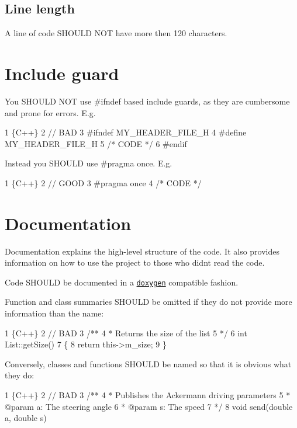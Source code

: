 \subsection*{Line length}

A line of code S\+H\+O\+U\+LD N\+OT have more then 120 characters.

\section*{Include guard}

You S\+H\+O\+U\+LD N\+OT use {\ttfamily \#ifndef} based include guards, as they are cumbersome and prone for errors. E.\+g. 
\begin{DoxyCode}
1 \{C++\}
2 // BAD
3 #ifndef MY\_HEADER\_FILE\_H
4 #define MY\_HEADER\_FILE\_H
5 /* CODE */
6 #endif
\end{DoxyCode}
 Instead you S\+H\+O\+U\+LD use {\ttfamily \#pragma once}. E.\+g. 
\begin{DoxyCode}
1 \{C++\}
2 // GOOD
3 #pragma once
4 /* CODE */
\end{DoxyCode}


\section*{Documentation}

Documentation explains the high-\/level structure of the code. It also provides information on how to use the project to those who didn\textquotesingle{}t read the code.

Code S\+H\+O\+U\+LD be documented in a \href{http://www.doxygen.nl/manual/docblocks.html}{\tt doxygen} compatible fashion.

Function and class summaries S\+H\+O\+U\+LD be omitted if they do not provide more information than the name\+:


\begin{DoxyCode}
1 \{C++\}
2 // BAD
3 /**
4  *  Returns the size of the list
5  */
6 int List::getSize()
7 \{
8     return this->m\_size;
9 \}
\end{DoxyCode}


Conversely, classes and functions S\+H\+O\+U\+LD be named so that it is obvious what they do\+:


\begin{DoxyCode}
1 \{C++\}
2 // BAD
3 /**
4  *   Publishes the Ackermann driving parameters
5  *   @param a: The steering angle
6  *   @param s: The speed
7  */
8 void send(double a, double s)
\end{DoxyCode}



